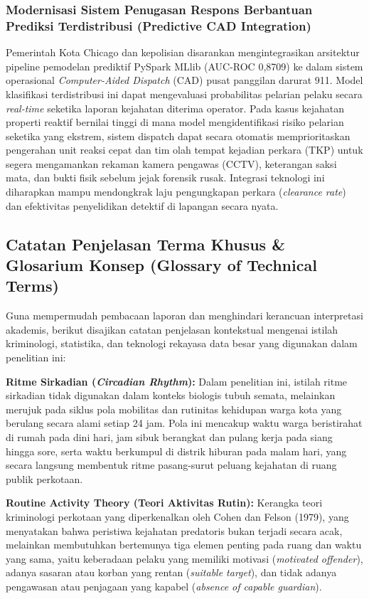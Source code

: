 \documentclass[11pt,a4paper]{article}
\begin{document}
\subsubsection{Modernisasi Sistem Penugasan Respons Berbantuan Prediksi Terdistribusi (Predictive CAD Integration)}
Pemerintah Kota Chicago dan kepolisian disarankan mengintegrasikan arsitektur pipeline pemodelan prediktif PySpark MLlib (AUC-ROC 0,8709) ke dalam sistem operasional \textit{Computer-Aided Dispatch} (CAD) pusat panggilan darurat 911. Model klasifikasi terdistribusi ini dapat mengevaluasi probabilitas pelarian pelaku secara \textit{real-time} seketika laporan kejahatan diterima operator. Pada kasus kejahatan properti reaktif bernilai tinggi di mana model mengidentifikasi risiko pelarian seketika yang ekstrem, sistem dispatch dapat secara otomatis memprioritaskan pengerahan unit reaksi cepat dan tim olah tempat kejadian perkara (TKP) untuk segera mengamankan rekaman kamera pengawas (CCTV), keterangan saksi mata, dan bukti fisik sebelum jejak forensik rusak. Integrasi teknologi ini diharapkan mampu mendongkrak laju pengungkapan perkara (\textit{clearance rate}) dan efektivitas penyelidikan detektif di lapangan secara nyata.

\subsection{Catatan Penjelasan Terma Khusus \& Glosarium Konsep (Glossary of Technical Terms)}
Guna mempermudah pembacaan laporan dan menghindari kerancuan interpretasi akademis, berikut disajikan catatan penjelasan kontekstual mengenai istilah kriminologi, statistika, dan teknologi rekayasa data besar yang digunakan dalam penelitian ini:

\textbf{Ritme Sirkadian (\textit{Circadian Rhythm}):} Dalam penelitian ini, istilah ritme sirkadian tidak digunakan dalam konteks biologis tubuh semata, melainkan merujuk pada siklus pola mobilitas dan rutinitas kehidupan warga kota yang berulang secara alami setiap 24 jam. Pola ini mencakup waktu warga beristirahat di rumah pada dini hari, jam sibuk berangkat dan pulang kerja pada siang hingga sore, serta waktu berkumpul di distrik hiburan pada malam hari, yang secara langsung membentuk ritme pasang-surut peluang kejahatan di ruang publik perkotaan.

\textbf{Routine Activity Theory (Teori Aktivitas Rutin):} Kerangka teori kriminologi perkotaan yang diperkenalkan oleh Cohen dan Felson (1979), yang menyatakan bahwa peristiwa kejahatan predatoris bukan terjadi secara acak, melainkan membutuhkan bertemunya tiga elemen penting pada ruang dan waktu yang sama, yaitu keberadaan pelaku yang memiliki motivasi (\textit{motivated offender}), adanya sasaran atau korban yang rentan (\textit{suitable target}), dan tidak adanya pengawasan atau penjagaan yang kapabel (\textit{absence of capable guardian}).
\end{document}
